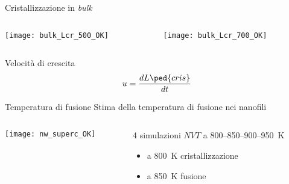 \documentclass{beamer}
\begin{document}
\begin{frame}{Cristallizzazione in \gete \emph{bulk}}
{\begin{columns}
   \begin{column}{0.5\textwidth}
    \texttt{[image: bulk\_Lcr\_500\_OK]}
   \end{column}
   \begin{column}{0.5\textwidth}
    \texttt{[image: bulk\_Lcr\_700\_OK]}
   \end{column}
  \end{columns}
 \vspace{.5cm}
 \centering
 Velocità di crescita
 \[ u = \frac{dL\ped{cris}}{dt} \]
}
\end{frame}



\begin{frame}{Temperatura di fusione}
\centering
Stima della temperatura di fusione nei nanofili\\[12pt]
\begin{columns}
\begin{column}{0.4\textwidth}
\texttt{[image: nw\_superc\_OK]}
\end{column}
%
\begin{column}{0.6\textwidth}
 4 simulazioni $NVT$ a \num{800}--\num{850}--\num{900}--\SI{950}{K}%
  \begin{itemize}
    \item a \SI{800}{K} {\ev cristallizzazione}
    \item a \SI{850}{K} {\ev fusione}
  \end{itemize}
\end{column}
\end{columns}

\end{frame}



\end{document}
